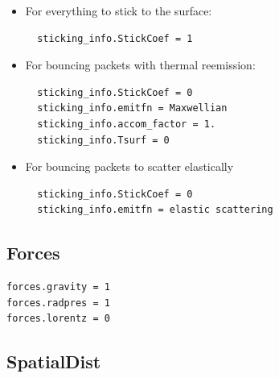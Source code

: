 \documentclass[11pt]{article}
\begin{document}
\begin{itemize}
\item For everything to stick to the surface:
  \begin{verbatim}
  sticking_info.StickCoef = 1
  \end{verbatim}
\item For bouncing packets with thermal reemission:
  \begin{verbatim}
  sticking_info.StickCoef = 0
  sticking_info.emitfn = Maxwellian
  sticking_info.accom_factor = 1.
  sticking_info.Tsurf = 0
  \end{verbatim}
\item For bouncing packets to scatter elastically 
  \begin{verbatim}
  sticking_info.StickCoef = 0
  sticking_info.emitfn = elastic scattering
  \end{verbatim}
\end{itemize}

\subsection{Forces}

\begin{verbatim}
forces.gravity = 1
forces.radpres = 1
forces.lorentz = 0
\end{verbatim}

\subsection{SpatialDist}
\end{document}
